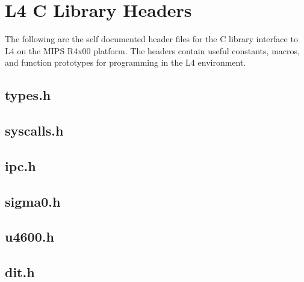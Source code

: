 \documentclass[a4paper,11pt,twoside,dvips]{book}
\begin{document}
\chapter{L4 C Library Headers}

The following are the self documented header files for the C library
interface to L4 on the MIPS R4x00 platform. The headers
contain useful constants, macros, and function prototypes for
programming in the L4 environment.


\section{types.h}

{\footnotesize


\clearpage
\section{syscalls.h}



\clearpage
\section{ipc.h}



\clearpage
\section{sigma0.h}



\clearpage
\section{u4600.h}



\clearpage
\section{dit.h}


}

 
 
 
 
 
\end{document}
